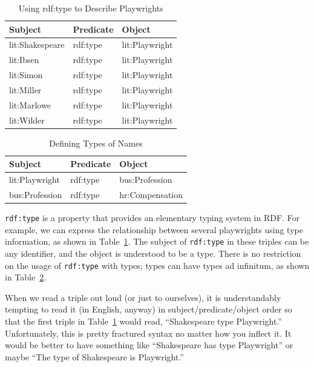 \begin{table}[h]
\centering
\begin{tabular}{||l l l ||} 
 \hline
 Subject&Predicate&Object \\ [0.5ex] 
 \hline\hline
lit:Shakespeare&rdf:type&lit:Playwright \\
lit:Ibsen&rdf:type&lit:Playwright \\
lit:Simon&rdf:type&lit:Playwright \\
lit:Miller&rdf:type&lit:Playwright \\
lit:Marlowe&rdf:type&lit:Playwright \\
lit:Wilder&rdf:type&lit:Playwright \\
\hline
\end{tabular}
\caption{Using rdf:type to Describe Playwrights}
\label{tab:ch3.9}
\end{table}


\begin{table}[h]
\centering
\begin{tabular}{||l l l ||} 
 \hline
 Subject&Predicate&Object \\ [0.5ex] 
 \hline\hline
lit:Playwright&rdf:type&bus:Profession \\
bus:Profession&rdf:type&hr:Compensation \\
\hline
\end{tabular}
\caption{Defining Types of Names}
\label{tab:ch3.10}
\end{table}



\texttt{rdf:type} is a property that provides an elementary typing system in RDF.
For example, we can express the relationship between several playwrights
using type information, as shown in Table~\ref{tab:ch3.9}. The subject of \texttt{rdf:type}
in these triples can be any identifier, and the object is understood to
be a type. There is no restriction on the usage of \texttt{rdf:type}
with types;
types can have types ad infinitum, as shown in Table~\ref{tab:ch3.10}.

When we read a triple out loud (or just to ourselves), it is
understandably tempting to read it (in English, anyway) in
subject/predicate/object order so that the first triple in Table~\ref{tab:ch3.9}
would read, ``Shakespeare type Playwright.'' Unfortunately, this is
pretty fractured syntax no matter how you inflect it. It would be better
to have something like ``Shakespeare has type Playwright'' or maybe
``The type of Shakespeare is Playwright.''

